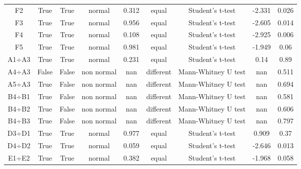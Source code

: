 \begin{table}[H]
\begin{tabular}{|c|c|c|c|c|c|c|c|c|}
F2 & True & True & normal & 0.312 & equal & Student's t-test & -2.331 & 0.026 \\ 
F3 & True & True & normal & 0.956 & equal & Student's t-test & -2.605 & 0.014 \\ 
F4 & True & True & normal & 0.108 & equal & Student's t-test & -2.925 & 0.006 \\ 
F5 & True & True & normal & 0.981 & equal & Student's t-test & -1.949 & 0.06 \\ 
A1÷A3 & True & True & normal & 0.231 & equal & Student's t-test & 0.14 & 0.89 \\ 
A4÷A3 & False & False & non normal & nan & different & Mann-Whitney U test & nan & 0.511 \\ 
A5÷A3 & True & False & non normal & nan & different & Mann-Whitney U test & nan & 0.694 \\ 
B4÷B1 & True & False & non normal & nan & different & Mann-Whitney U test & nan & 0.581 \\ 
B4÷B2 & True & False & non normal & nan & different & Mann-Whitney U test & nan & 0.606 \\ 
B4÷B3 & True & False & non normal & nan & different & Mann-Whitney U test & nan & 0.797 \\ 
D3÷D1 & True & True & normal & 0.977 & equal & Student's t-test & 0.909 & 0.37 \\ 
D4÷D2 & True & True & normal & 0.059 & equal & Student's t-test & -2.646 & 0.013 \\ 
E1÷E2 & True & True & normal & 0.382 & equal & Student's t-test & -1.968 & 0.058 \\ 
\hline
\end{tabular}
\end{table}


